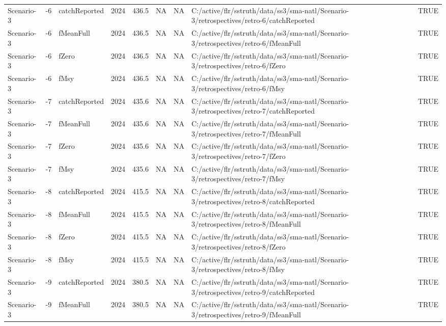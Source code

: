 \begin{table}
\begin{tabular}[t]{lllrrrrll}
Scenario-3 & -6 & catchReported & 2024 & 436.5 & NA & NA & C:/active/flr/sstruth/data/ss3/sma-natl/Scenario-3/retrospectives/retro-6/catchReported & TRUE\\
Scenario-3 & -6 & fMeanFull & 2024 & 436.5 & NA & NA & C:/active/flr/sstruth/data/ss3/sma-natl/Scenario-3/retrospectives/retro-6/fMeanFull & TRUE\\
\addlinespace
Scenario-3 & -6 & fZero & 2024 & 436.5 & NA & NA & C:/active/flr/sstruth/data/ss3/sma-natl/Scenario-3/retrospectives/retro-6/fZero & TRUE\\
Scenario-3 & -6 & fMsy & 2024 & 436.5 & NA & NA & C:/active/flr/sstruth/data/ss3/sma-natl/Scenario-3/retrospectives/retro-6/fMsy & TRUE\\
Scenario-3 & -7 & catchReported & 2024 & 435.6 & NA & NA & C:/active/flr/sstruth/data/ss3/sma-natl/Scenario-3/retrospectives/retro-7/catchReported & TRUE\\
Scenario-3 & -7 & fMeanFull & 2024 & 435.6 & NA & NA & C:/active/flr/sstruth/data/ss3/sma-natl/Scenario-3/retrospectives/retro-7/fMeanFull & TRUE\\
Scenario-3 & -7 & fZero & 2024 & 435.6 & NA & NA & C:/active/flr/sstruth/data/ss3/sma-natl/Scenario-3/retrospectives/retro-7/fZero & TRUE\\
\addlinespace
Scenario-3 & -7 & fMsy & 2024 & 435.6 & NA & NA & C:/active/flr/sstruth/data/ss3/sma-natl/Scenario-3/retrospectives/retro-7/fMsy & TRUE\\
Scenario-3 & -8 & catchReported & 2024 & 415.5 & NA & NA & C:/active/flr/sstruth/data/ss3/sma-natl/Scenario-3/retrospectives/retro-8/catchReported & TRUE\\
Scenario-3 & -8 & fMeanFull & 2024 & 415.5 & NA & NA & C:/active/flr/sstruth/data/ss3/sma-natl/Scenario-3/retrospectives/retro-8/fMeanFull & TRUE\\
Scenario-3 & -8 & fZero & 2024 & 415.5 & NA & NA & C:/active/flr/sstruth/data/ss3/sma-natl/Scenario-3/retrospectives/retro-8/fZero & TRUE\\
Scenario-3 & -8 & fMsy & 2024 & 415.5 & NA & NA & C:/active/flr/sstruth/data/ss3/sma-natl/Scenario-3/retrospectives/retro-8/fMsy & TRUE\\
\addlinespace
Scenario-3 & -9 & catchReported & 2024 & 380.5 & NA & NA & C:/active/flr/sstruth/data/ss3/sma-natl/Scenario-3/retrospectives/retro-9/catchReported & TRUE\\
Scenario-3 & -9 & fMeanFull & 2024 & 380.5 & NA & NA & C:/active/flr/sstruth/data/ss3/sma-natl/Scenario-3/retrospectives/retro-9/fMeanFull & TRUE\\

\end{tabular}
\end{table}
